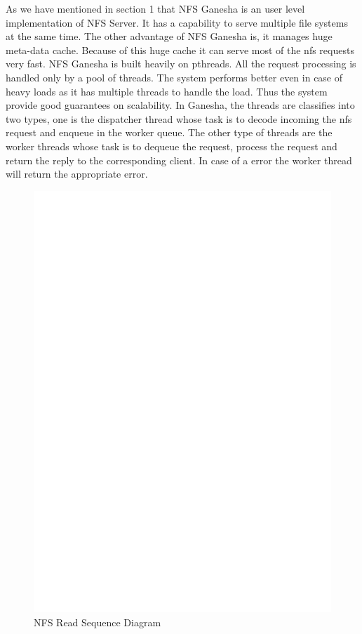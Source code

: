    As we have mentioned in section 1 that NFS Ganesha is an user level implementation of NFS Server. It has a capability to serve multiple file systems at the same time. The other advantage of NFS Ganesha is, it manages huge meta-data cache. Because of this huge cache it can serve most of the nfs requests very fast. NFS Ganesha is built heavily on pthreads.
All the request processing is handled only by a pool of threads. The system performs better even in case of heavy loads as it has multiple threads to handle the load. Thus the system provide good guarantees on scalability. In Ganesha, the threads are classifies into two types, one is the dispatcher thread whose task is to decode incoming the nfs request and enqueue in the worker queue. The other type of threads are the worker threads whose task is to dequeue the request, process the request and return the reply to the corresponding client. In case of a error the worker thread will return the appropriate error.

\begin{figure}
\centering
\includegraphics[scale=0.9]{figures/ReadSequence.eps}
\caption{NFS Read Sequence Diagram}
\label{fig:NFSRead}
\end{figure}


